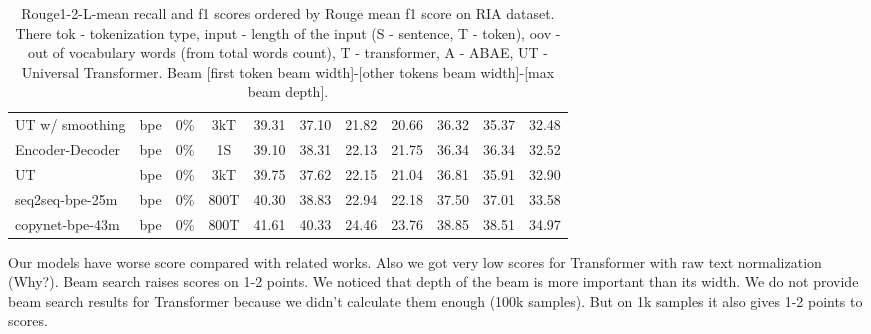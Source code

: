 \documentclass{article}
\begin{document}
\begin{table}[tbh!]
\begin{center}
\begin{tabular}[t]{|l|c|c|c|ccccccc|}
UT w/ smoothing \cite{gavrilov2018self} & bpe & 0\% & 3kT &  39.31 & 37.10 & 21.82 & 20.66 & 36.32 & 35.37 & 32.48 \\
Encoder-Decoder \cite{gavrilov2018self} & bpe & 0\% & 1S & 39.10 & 38.31 & 22.13 & 21.75 & 36.34 & 36.34 & 32.52 \\
UT \cite{gavrilov2018self}   & bpe & 0\% & 3kT & 39.75 & 37.62 & 22.15 & 21.04 & 36.81 & 35.91 & 32.90 \\
seq2seq-bpe-25m \cite{gusev2019importance} & bpe & 0\% & 800T & 40.30 & 38.83 & 22.94 & 22.18 & 37.50 & 37.01 & 33.58 \\
copynet-bpe-43m \cite{gusev2019importance} & bpe & 0\% & 800T & 41.61 & 40.33 & 24.46 & 23.76 & 38.85 & 38.51 & 34.97 \\
\hline
\end{tabular}
\caption{Rouge1-2-L-mean recall and f1 scores ordered by Rouge mean f1 score on RIA dataset. There tok - tokenization type, input - length of the input (S - sentence, T - token), oov - out of vocabulary words (from total words count), T - transformer, A - ABAE, UT - Universal Transformer. Beam [first token beam width]-[other tokens beam width]-[max beam depth].}
\label{tab:scores}
\end{center}
\end{table}

Our models have worse score compared with related works. Also we got very low scores for Transformer with raw text normalization (Why?). Beam search raises scores on 1-2 points. We noticed that depth of the beam is more important than its width. We do not provide beam search results for Transformer because we didn't calculate them enough (100k samples). But on 1k samples it also gives  1-2 points to scores.
\end{document}
